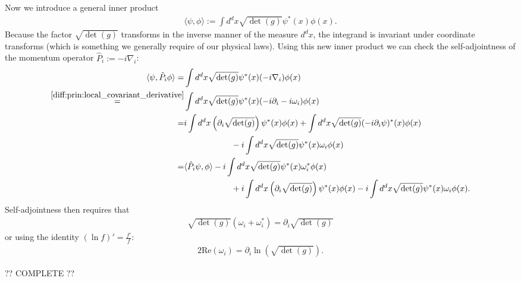 \begin{construct}
        Now we introduce a general inner product
        \begin{gather}
            \langle\psi, \phi\rangle := \int d^dx\sqrt{\det(g)}\psi^*(x)\phi(x).
        \end{gather}
        Because the factor $\sqrt{\det(g)}$ transforms in the inverse manner of the measure $d^dx$, the integrand is invariant under coordinate transforms (which is something we generally require of our physical laws). Using this new inner product we can check the self-adjointness of the momentum operator $\hat{P}_i := -i\nabla_i$:
        \begin{align*}
            \langle\psi, \hat{P}_i\phi\rangle = &\int d^dx\sqrt{\det(g)}\psi^*(x)(-i\nabla_i)\phi(x)\\
            \overset{\ref{diff:prin:local_covariant_derivative}}{=} &\int d^dx\sqrt{\det(g)}\psi^*(x)(-i\partial_i - i\omega_i)\phi(x)\\
            = &i\int d^dx\left(\partial_i\sqrt{\det(g)}\right)\psi^*(x)\phi(x) + \int d^dx\sqrt{\det(g)}(-i\partial_i\psi)^*(x)\phi(x)\\
                &\hspace{2cm} -i \int d^dx\sqrt{\det(g)}\psi^*(x)\omega_i\phi(x)\\
            = &\langle\hat{P}_i\psi, \phi\rangle -i \int d^dx\sqrt{\det(g)}\psi^*(x)\omega_i^*\phi(x)\\
                &\hspace{2cm} + i\int d^dx\left(\partial_i\sqrt{\det(g)}\right)\psi^*(x)\phi(x) -i \int d^dx\sqrt{\det(g)}\psi^*(x)\omega_i\phi(x).
        \end{align*}
        Self-adjointness then requires that
        \begin{gather}
            \sqrt{\det(g)}(\omega_i + \omega_i^*) = \partial_i\sqrt{\det(g)}
        \end{gather}
        or using the identity $(\ln f)' = \frac{f'}{f}$:
        \begin{gather}
            2\text{Re}(\omega_i) = \partial_i\ln\left(\sqrt{\det(g)}\right).
        \end{gather}
    \end{construct}

    ?? COMPLETE ??

\section{}\label{section:geometric_quantization}
